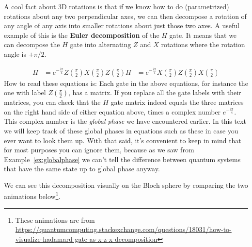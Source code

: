 \documentclass{article}
\theoremstyle{definition}
\begin{document}
A cool fact about 3D rotations is that if we know how to do (parametrized) rotations about any two perpendicular axes, we can then decompose a rotation of any angle of any axis into smaller rotations about just those two axes.
A useful example of this is the \textbf{Euler decomposition} of the $H$ gate.  It means that we can decompose the $H$ gate into alternating $Z$ and $X$ rotations where the rotation angle is $\pm \pi/2$.

\begin{align}
	H &= e^{-\frac{i\pi}{4}} Z\left(\frac{\pi}{2}\right) X\left(\frac{\pi}{2}\right) Z\left(\frac{\pi}{2}\right)
	H &= e^{-\frac{i\pi}{4}} X\left(\frac{\pi}{2}\right) Z\left(\frac{\pi}{2}\right) X\left(\frac{\pi}{2}\right)
\end{align}
How to read these equations is: Each gate in the above equations, for instance the one with label $Z\left(\frac{\pi}{2}\right)$, has a matrix.
If you replace all the gate labels with their matrices, you can check that the $H$ gate matrix indeed equals the three matrices on the right hand side of either equation above, times a complex number $e^{-\frac{i\pi}{4}}$.  This complex number is the \textit{global phase} we have encountered earlier.  In this text we will keep track of these global phases in equations such as these in case you ever want to look them up.  With that said, it's convenient to keep in mind that for most purposes you can ignore them, because as we saw from Example~\ref{ex:globalphase} we can't tell the difference between quantum systems that have the same state up to global phase anyway.

We can see this decomposition visually on the Bloch sphere by comparing the two animations below\footnote{These animations are from \url{https://quantumcomputing.stackexchange.com/questions/18031/how-to-visualize-hadamard-gate-as-x-z-x-decomposition}}.
\noindent%
\begin{minipage}[t]{0.45\linewidth}
	\begin{frame}{}
	\end{frame}\end{minipage}%
\hfill%
\begin{minipage}[t]{0.45\linewidth}
	\begin{frame}{}
	\end{frame}
\end{minipage}
\end{document}
